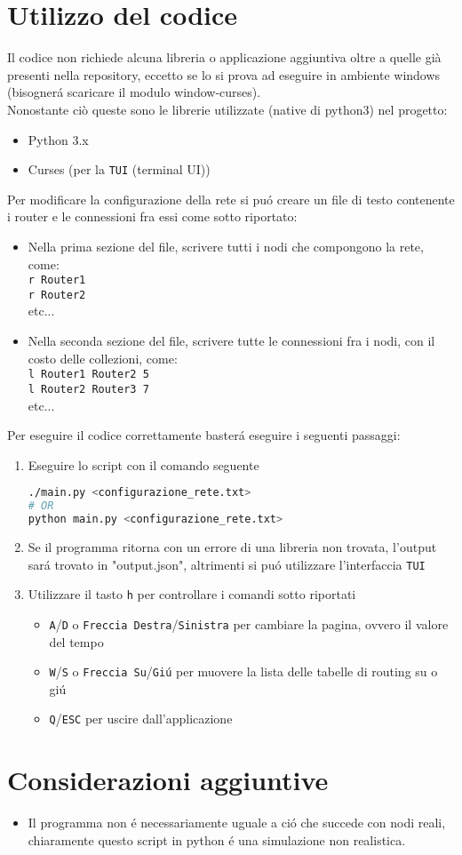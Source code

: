 \documentclass[12pt]{article}
\begin{document}
\section{Utilizzo del codice}
Il codice non richiede alcuna libreria o applicazione aggiuntiva oltre a quelle già presenti nella repository, eccetto se lo si prova ad eseguire in ambiente windows (bisognerá scaricare il modulo window-curses).
\\
Nonostante ciò queste sono le librerie utilizzate (native di python3) nel progetto:
\begin{itemize}
  \item Python 3.x
  \item Curses (per la \texttt{TUI} (terminal UI))
\end{itemize}
Per modificare la configurazione della rete si puó creare un file di testo contenente i router e le connessioni fra essi come sotto riportato:
\begin{itemize}
    \item Nella prima sezione del file, scrivere tutti i nodi che compongono la rete, come: \\ \texttt{r Router1} \\ \texttt{r Router2} \\ etc...
    \item Nella seconda sezione del file, scrivere tutte le connessioni fra i nodi, con il costo delle collezioni, come: \\ \texttt{l Router1 Router2 5} \\ \texttt{l Router2 Router3 7} \\ etc...
\end{itemize}
Per eseguire il codice correttamente basterá eseguire i seguenti passaggi:
\begin{enumerate}
\item Eseguire lo script con il comando seguente
\begin{lstlisting}[language=Bash, caption=Esecuzione dello script]
./main.py <configurazione_rete.txt>
# OR
python main.py <configurazione_rete.txt>
\end{lstlisting}
\item Se il programma ritorna con un errore di una libreria non trovata, l'output sará trovato in "output.json", altrimenti si puó utilizzare l'interfaccia \texttt{TUI}
\item Utilizzare il tasto \texttt{h} per controllare i comandi sotto riportati
\begin{itemize}
\item \texttt{A}/\texttt{D} o \texttt{Freccia Destra}/\texttt{Sinistra} per cambiare la pagina, ovvero il valore del tempo
\item \texttt{W}/\texttt{S} o \texttt{Freccia Su}/\texttt{Giú} per muovere la lista delle tabelle di routing su o giú
\item \texttt{Q}/\texttt{ESC} per uscire dall'applicazione
\end{itemize}
\end{enumerate}
\section{Considerazioni aggiuntive}
\begin{itemize}
\item Il programma non é necessariamente uguale a ció che succede con nodi reali, chiaramente questo script in python é una simulazione non realistica.
\end{itemize}
\end{document}

